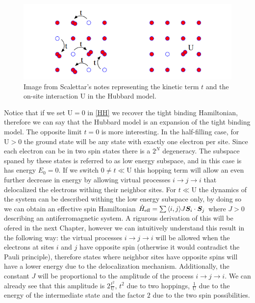 \begin{figure}
\centering
  \includegraphics[width=\linewidth]{../Figures/hubbard.png}
  \caption{Image from Scalettar's notes representing the kinetic term $t$ and the on-site interaction $\text{U}$ in the Hubbard model.} 
\label{fig:Hubbard}
\end{figure}

Notice that if we set $\text{U}=0$ in \ref{HH} we recover the tight binding Hamiltonian, therefore we can say that the Hubbard model is an expansion of the tight binding model. The opposite limit $t=0$ is more interesting. In the half-filling case, for $\text{U}>0$ the ground state will be any state with exactly one electron per site. Since each electron can be in two spin states there is a $2^N$ degeneracy. The subspace spaned by these states is referred to as low energy subspace, and in this case is has energy $E_0 = 0$. If we switch $0 \neq t \ll \text{U}$ this hopping term will allow an even further decrease in energy by allowing virtual processes $i \rightarrow j \rightarrow i$ that delocalized the electrons withing their neighbor sites. For $t \ll \text{U}$ the dynamics of the system can be described withing the low energy subspace only, by doing so we can obtain an effective spin Hamiltonian $\hat{H}_{\text{eff}} = \sum{\langle i,j \rangle} J \boldsymbol{S}_i\cdot\boldsymbol{S}_j$ where $J>0$ describing an antiferromagnetic system. A rigurous derivation of this will be ofered in the next Chapter, however we can intuitively understand this result in the following way: the virtual processes $i \rightarrow j \rightarrow i$ will be allowed when the electrons at sites $i$ and $j$ have opposite spin (otherwise it would contradict the Pauli principle), therefore states where neighbor sites have opposite spins will have a lower energy due to the delocalization mechanism. Additionally, the constant $J$ will be proportional to the amplitude of the process $i \rightarrow j \rightarrow i$. We can already see that this amplitude is $2\frac{t^2}{\text{U}}$, $t^2$ due to two hoppings, $\frac{1}{\text{U}}$ due to the energy of the intermediate state and the factor $2$ due to the two spin possibilities.







